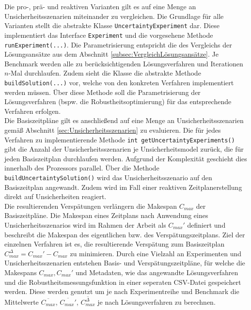 Die pro-, prä- und reaktiven Varianten gilt es auf eine Menge an Unsicherheitsszenarien miteinander zu vergleichen. Die Grundlage für alle Varianten stellt die abstrakte Klasse \lstinline|UncertaintyExperiment| dar. Diese implementiert das Interface \lstinline|Experiment| und die vorgesehene Methode \lstinline|runExperiment(...)|. Die Parametrisierung entspricht die des Vergleichs der Lösungsansätze aus dem Abschnitt \ref{subsec:VergleichLösungsansätze}. Je Benchmark werden alle zu berücksichtigenden Lösungsverfahren und Iterationen $n$-Mal durchlaufen. Zudem sieht die Klasse die abstrakte Methode \lstinline|buildSolution(...)| vor, welche von den konkreten Verfahren implementiert werden müssen. Über diese Methode soll die Parametrisierung der Lösungsverfahren (bspw. die Robustheitsoptimierung) für das entsprechende Verfahren erfolgen. \\

Die Basiszeitpläne gilt es anschließend auf eine Menge an Unsicherheitsszenarien gemäß Abschnitt \ref{sec:Unsicherheitsszenarien} zu evaluieren. Die für jedes Verfahren zu implementierende Methode \lstinline|int getUncertaintyExperiments()| gibt die Anzahl der Unsicherheitsszenarien je Unsicherheitsmodel zurück, die für jeden Basiszeitplan durchlaufen werden. Aufgrund der Komplexität geschieht dies innerhalb des Prozessors parallel. Über die Methode \lstinline|buildUncertaintySolution()| wird das Unsicherheitsszenario auf den Basiszeitplan angewandt. Zudem wird im Fall einer reaktiven Zeitplanerstellung direkt auf Unsicherheiten reagiert. \\

Die resultierenden Verspätungen verlängern die Makespan $C_{max}$ der Basiszeitpläne. Die Makespan eines Zeitplans nach Anwendung eines Unsicherheitsszenarios wird im Rahmen der Arbeit als $C_{max}'$ definiert und beschreibt die Makespan des eigentlichen bzw. des Verspätungszeitplans. Ziel der einzelnen Verfahren ist es, die resultierende Verspätung zum Basiszeitplan $C_{max}^\Delta = C_{max}' - C_{max}$ zu minimieren. Durch eine Vielzahl an Experimenten und Unsicherheitsszenarien entstehen Basis- und Verspätungszeitpläne, für welche die Makespans $C_{max}, C_{max}'$ und Metadaten, wie das angewandte Lösungsverfahren und die Robustheitsmessungsfunktion in einer seperaten CSV-Datei gespeichert werden. Diese werden genutzt um je nach Experimentreihe und Benchmark die Mittelwerte $\overline{C_{max}}$, $\overline{C_{max}'}$, $\overline{C_{max}^\Delta}$ je nach Lösungsverfahren zu berechnen.  \\

